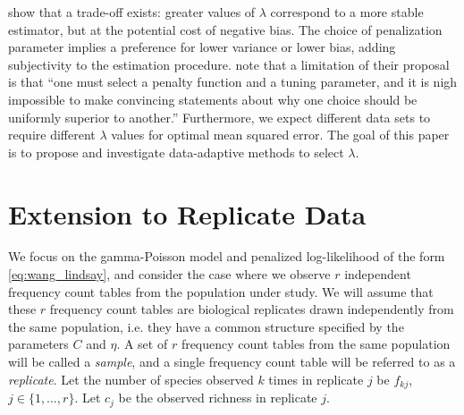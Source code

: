 \documentclass[oupdraft]{bio}
\begin{document}
\citet{wang_2005} show that a trade-off exists: greater values of $\lambda$ correspond to a more stable estimator, but at the potential cost of negative bias.
The choice of penalization parameter implies a preference for lower variance or lower bias, adding subjectivity to the estimation procedure.
\citet{wang_2005} note that a limitation of their proposal is that ``one must select a penalty function and a tuning parameter, and it is nigh impossible to make convincing statements about why one choice should be uniformly superior to another.''
Furthermore, we expect different data sets to require different $\lambda$ values for optimal mean squared error.
The goal of this paper is to propose and investigate data-adaptive methods to select $\lambda$.


\section{Extension to Replicate Data}
\label{sec:fixed_lambda}

We focus on the gamma-Poisson model and penalized log-likelihood of the form \eqref{eq:wang_lindsay}, and consider the case where we observe $r$ independent frequency count tables from the population under study.
We will assume that these $r$ frequency count tables are biological replicates drawn independently from the same population, i.e. they have a common structure specified by the parameters $C$ and $\eta$.  A set of $r$ frequency count tables from the same population will be called a \textit{sample}, and a single frequency count table will be referred to as a \textit{replicate}.  Let the number of species observed $k$ times in replicate $j$ be $f_{kj}$, $j \in \{1, \dots , r\}$.  Let $c_j$ be the observed richness in replicate $j$.

\end{document}

